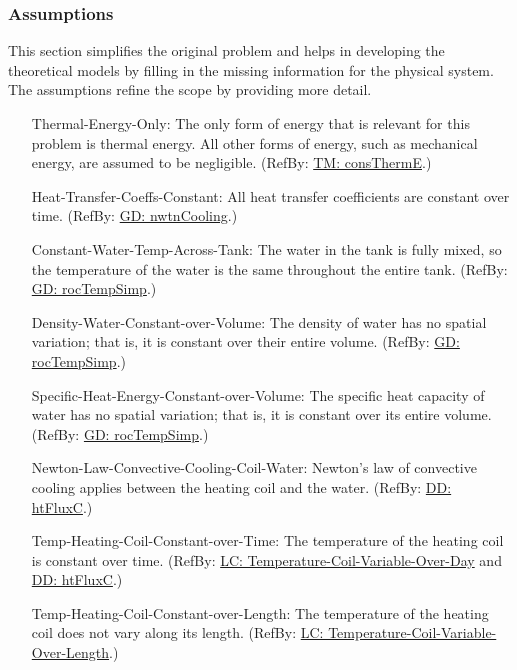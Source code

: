 \documentclass[12pt]{article}
\begin{document}
\subsubsection{Assumptions}
\label{Sec:Assumps}
This section simplifies the original problem and helps in developing the theoretical models by filling in the missing information for the physical system. The assumptions refine the scope by providing more detail.
\begin{itemize}
\item[Thermal-Energy-Only:\phantomsection\label{assumpTEO}]The only form of energy that is relevant for this problem is thermal energy. All other forms of energy, such as mechanical energy, are assumed to be negligible. (RefBy: \hyperref[TM:consThermE]{TM: consThermE}.)
\item[Heat-Transfer-Coeffs-Constant:\phantomsection\label{assumpHTCC}]All heat transfer coefficients are constant over time. (RefBy: \hyperref[GD:nwtnCooling]{GD: nwtnCooling}.)
\item[Constant-Water-Temp-Across-Tank:\phantomsection\label{assumpCWTAT}]The water in the tank is fully mixed, so the temperature of the water is the same throughout the entire tank. (RefBy: \hyperref[GD:rocTempSimp]{GD: rocTempSimp}.)
\item[Density-Water-Constant-over-Volume:\phantomsection\label{assumpDWCoW}]The density of water has no spatial variation; that is, it is constant over their entire volume. (RefBy: \hyperref[GD:rocTempSimp]{GD: rocTempSimp}.)
\item[Specific-Heat-Energy-Constant-over-Volume:\phantomsection\label{assumpSHECoW}]The specific heat capacity of water has no spatial variation; that is, it is constant over its entire volume. (RefBy: \hyperref[GD:rocTempSimp]{GD: rocTempSimp}.)
\item[Newton-Law-Convective-Cooling-Coil-Water:\phantomsection\label{assumpLCCCW}]Newton's law of convective cooling applies between the heating coil and the water. (RefBy: \hyperref[DD:htFluxC]{DD: htFluxC}.)
\item[Temp-Heating-Coil-Constant-over-Time:\phantomsection\label{assumpTHCCoT}]The temperature of the heating coil is constant over time. (RefBy: \hyperref[likeChgTCVOD]{LC: Temperature-Coil-Variable-Over-Day} and \hyperref[DD:htFluxC]{DD: htFluxC}.)
\item[Temp-Heating-Coil-Constant-over-Length:\phantomsection\label{assumpTHCCoL}]The temperature of the heating coil does not vary along its length. (RefBy: \hyperref[likeChgTCVOL]{LC: Temperature-Coil-Variable-Over-Length}.)

\end{itemize}
\end{document}
